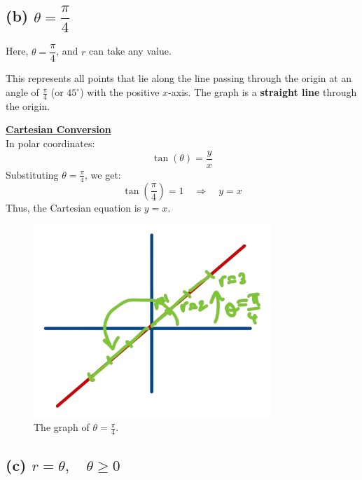 \documentclass{article}
\begin{document}
\subsection*{(b) \( \theta = \dfrac{\pi}{4} \)}

\begin{solutionbox}
Here, \( \theta = \dfrac{\pi}{4} \), and \( r \) can take any value. 

This represents all points that lie along the line passing through the origin at an angle of \( \frac{\pi}{4} \) (or \( 45^\circ \)) with the positive \( x \)-axis. The graph is a \textbf{straight line} through the origin.

\begin{conceptbox}
    \textbf{\underline{Cartesian Conversion}} \\ 
    In polar coordinates:
    \[
    \tan(\theta) = \frac{y}{x}
    \]
    Substituting \( \theta = \frac{\pi}{4} \), we get:
    \[
    \tan\left(\frac{\pi}{4}\right) = 1 \quad \Rightarrow \quad y = x
    \]
    Thus, the Cartesian equation is \( y = x \).
\end{conceptbox}
\begin{figure}[H]
    \centering
    \includegraphics[width=0.8\textwidth]{polar curve sketch b.png}
    \caption{The graph of \( \theta = \frac{\pi}{4} \).}
    \label{fig:line_graph}
\end{figure}
\end{solutionbox}

\subsection*{(c) \( r = \theta, \quad \theta \geq 0 \)}
\end{document}
